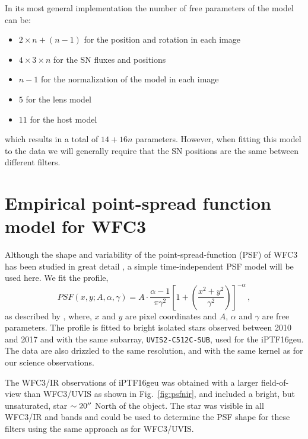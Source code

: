 \documentclass[a4paper,fleqn,usenatbib]{mnras}
\newcommand{\geu}{iPTF16geu\xspace}
\newcommand{\wfc}{WFC3\xspace}
\newcommand{\wfcuvis}{WFC3/UVIS\xspace}
\newcommand{\wfcir}{WFC3/IR\xspace}
\newcommand{\uvisaperture}{{\tt UVIS2-C512C-SUB}\xspace}
\begin{document}
In its most general implementation the number of free parameters of the model can be:
\begin{itemize}
\item $2\times n + (n-1)$ for the position and rotation in each image
\item $4\times 3 \times n$ for the SN fluxes and positions
\item $n-1$ for the normalization of the model in each image
\item $5$ for the lens model
\item $11$ for the host model
\end{itemize}
which results in a total of $14 + 16n$ parameters.  However, when fitting this model to the data we will generally require 
that the SN positions are the same between different filters.  


\section{Empirical point-spread function model for \wfc}
\label{sec:wfcpsf}
Although the shape and variability of the point-spread-function (PSF) of \wfc has been studied in great detail 
\citep{2016wfc..rept...12A,2017arXiv170600386A}, a simple time-independent PSF model will be used here.  
We fit the profile,
\[
	PSF(x,y;A,\alpha,\gamma) = A\cdot \frac{\alpha - 1}{\pi\gamma^2}\left[1 + \left(\frac{x^2 + y^2}{\gamma^2}\right)\right]^{-\alpha}\,,
\]
as described by \citet{1969A&A.....3..455M},  where, $x$ and $y$ are pixel coordinates and $A$, $\alpha$ and $\gamma$ are 
free parameters.  The profile is fitted to bright isolated stars observed between 2010 and 2017 and with the same subarray, 
\uvisaperture, used for the \geu.  The data are also drizzled to the same resolution, and with the same kernel as for our science 
observations.  

The \wfcir observations of \geu was obtained with a larger field-of-view than \wfcuvis as shown in Fig.~\ref{fig:psfnir}, and 
included a bright, but unsaturated, star $\sim20\hbox{$^{\prime\prime}$}$ North of the object.  The star was visible in all \wfcir and bands and
could be used to determine the PSF shape for these filters using the same approach as for \wfcuvis. 
\end{document}
